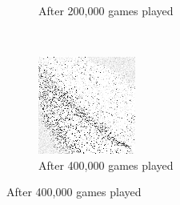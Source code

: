 \begin{figure}
\begin{subfigure}[t]{0.2\textwidth}
	\caption{After 200,000 games played}
	\end{subfigure}
	~
	\begin{subfigure}[t]{0.2\textwidth}
	\includegraphics[width=\textwidth]{images/findings/round1/flipbook_c.png}
	\caption{After 400,000 games played}
	\end{subfigure}


\end{figure}
